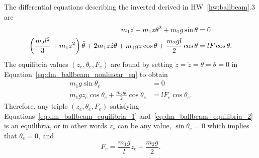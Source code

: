 
The differential equations describing the inverted derived in HW~\ref{hw:ballbeam}.3 are
\begin{align}
m_1 \ddot{z} - m_1 z \dot{\theta}^2 + m_1 g \sin\theta &= 0 
\label{eq:dm_ballbeam_nonlinear_eq}\\
\left( \frac{m_2 l^2}{3} + m_1 z^2 \right) \ddot{\theta} + 2 m_1 z \dot{z} \dot{\theta} + m_1 g z \cos\theta + \frac{m_2 g l}{2} \cos\theta &= l F \cos\theta. \notag
\end{align}
The equilibria values $(z_e,\theta_e,F_e)$ are found by setting $\dot{z}=\ddot{z}=\dot{\theta}=\ddot{\theta}=0$ in Equation~\eqref{eq:dm_ballbeam_nonlinear_eq} to obtain
\begin{align}
m_1 g \sin\theta_e &= 0 \label{eq:dm_ballbeam_equilibria_1}\\
m_1 g z_e \cos\theta_e + \frac{m_2 g l}{2} \cos\theta_e &=
l F_e \cos\theta_e.\label{eq:dm_ballbeam_equilibria_2}
\end{align}
Therefore, any triple $(z_e, \theta_e, F_e)$ satisfying Equations~\eqref{eq:dm_ballbeam_equilibria_1} and~\eqref{eq:dm_ballbeam_equilibria_2} is an equilibria, or in other words $z_e$ can be any value, $\sin\theta_e=0$ which implies that $\theta_e=0$, and 
\[
F_e = \frac{m_1 g}{ l} z_e + \frac{m_2 g}{2}. 
\]

